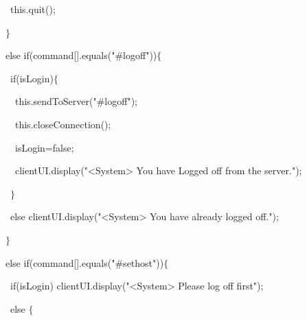 {{\hlstd }{\hlstd\ \ \ \ }{\hlstd }{\hlkwa this}{\hlstd }{\hlsym .}{\hlstd }{\hlkwd quit}{\hlstd }{\hlsym ();}\leavevmode\par
{\hlstd }{\hlstd\ \ \ }{\hlstd }{\hlsym $\}$}\leavevmode\par
{\hlstd }{\hlstd\ \ \ }{\hlstd }{\hlkwa else if}{\hlstd }{\hlsym (}{\hlstd command}{\hlsym [}{\hlstd }{}{\hlstd }{\hlsym ].}{\hlstd }{\hlkwd equals}{\hlstd }{\hlsym (}{\hlstd }{\hlstr "\#logoff"}{\hlstd }{\hlsym ))$\{$}\leavevmode\par
{\hlstd }{\hlstd\ \ \ \ }{\hlstd }{\hlkwa if}{\hlstd }{\hlsym (}{\hlstd isLogin}{\hlsym )$\{$}\leavevmode\par
{\hlstd }{\hlstd\ \ \ \ \ }{\hlstd }{\hlkwa this}{\hlstd }{\hlsym .}{\hlstd }{\hlkwd sendToServer}{\hlstd }{\hlsym (}{\hlstd }{\hlstr "\#logoff"}{\hlstd }{\hlsym );}\leavevmode\par
{\hlstd }{\hlstd\ \ \ \ \ }{\hlstd }{\hlkwa this}{\hlstd }{\hlsym .}{\hlstd }{\hlkwd closeConnection}{\hlstd }{\hlsym ();}\leavevmode\par
{\hlstd }{\hlstd\ \ \ \ \ }{\hlstd isLogin}{\hlsym $\mathord{=}$}{\hlstd false}{\hlsym ;}\leavevmode\par
{\hlstd }{\hlstd\ \ \ \ \ }{\hlstd clientUI}{\hlsym .}{\hlstd }{\hlkwd display}{\hlstd }{\hlsym (}{\hlstd }{\hlstr "$\mathord{<}$System$\mathord{>}$ You have Logged off from the server."}{\hlstd }{\hlsym );}\leavevmode\par
{\hlstd }{\hlstd\ \ \ \ }{\hlstd }{\hlsym $\}$}\leavevmode\par
{\hlstd }{\hlstd\ \ \ \ }{\hlstd }{\hlkwa else }{\hlstd clientUI}{\hlsym .}{\hlstd }{\hlkwd display}{\hlstd }{\hlsym (}{\hlstd }{\hlstr "$\mathord{<}$System$\mathord{>}$ You have already logged off."}{\hlstd }{\hlsym );}\leavevmode\par
{\hlstd }{\hlstd\ \ \ }{\hlstd }{\hlsym $\}$}\leavevmode\par
{\hlstd }{\hlstd\ \ \ }{\hlstd }{\hlkwa else if}{\hlstd }{\hlsym (}{\hlstd command}{\hlsym [}{\hlstd }{}{\hlstd }{\hlsym ].}{\hlstd }{\hlkwd equals}{\hlstd }{\hlsym (}{\hlstd }{\hlstr "\#sethost"}{\hlstd }{\hlsym ))$\{$}\leavevmode\par
{\hlstd }{\hlstd\ \ \ \ }{\hlstd }{\hlkwa if}{\hlstd }{\hlsym (}{\hlstd isLogin}{\hlsym ) }{\hlstd clientUI}{\hlsym .}{\hlstd }{\hlkwd display}{\hlstd }{\hlsym (}{\hlstd }{\hlstr "$\mathord{<}$System$\mathord{>}$ Please log off first"}{\hlstd }{\hlsym );}\leavevmode\par
{\hlstd }{\hlstd\ \ \ \ }{\hlstd }{\hlkwa else }{\hlstd }{\hlsym $\{$}\leavevmode\par
}
